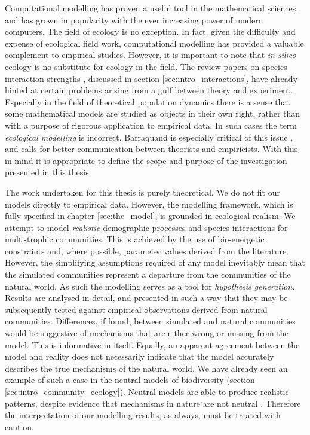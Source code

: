 Computational modelling has proven a useful tool in the mathematical sciences, and has grown in popularity with the ever increasing power of modern computers. The field of ecology is no exception. In fact, given the difficulty and expense of ecological field work, computational modelling has provided a valuable complement to empirical studies. However, it is important to note that \emph{in silico} ecology is no substitute for ecology in the field. The review papers on species interaction strengths \cite{berlow2004interaction,wootton2005measurement}, discussed in section \ref{sec:intro_interactions}, have already hinted at certain problems arising from a gulf between theory and experiment. Especially in the field of theoretical population dynamics there is a sense that some mathematical models are studied as objects in their own right, rather than with a purpose of rigorous application to empirical data. In such cases the term \emph{ecological modelling} is incorrect. Barraquand is especially critical of this issue \cite{barraquand2014functional}, and calls for better communication between theorists and empiricists. With this in mind it is appropriate to define the scope and purpose of the investigation presented in this thesis. 

The work undertaken for this thesis is purely theoretical. We do not fit our models directly to empirical data. However, the modelling framework, which is fully specified in chapter \ref{sec:the_model}, is grounded in ecological realism. We attempt to model \emph{realistic} demographic processes and species interactions for multi-trophic communities. This is achieved by the use of bio-energetic constraints and, where possible, parameter values derived from the literature. However, the simplifying assumptions required of any model inevitably mean that the simulated communities represent a departure from the communities of the natural world. As such the modelling serves as a tool for \emph{hypothesis generation}. Results are analysed in detail, and presented in such a way that they may be subsequently tested against empirical observations derived from natural communities. Differences, if found, between simulated and natural communities would be suggestive of mechanisms that are either wrong or missing from the model. This is informative in itself. Equally, an apparent agreement between the model and reality does not necessarily indicate that the model accurately describes the true mechanisms of the natural world. We have already seen an example of such a case in the neutral models of biodiversity (section \ref{sec:intro_community_ecology}). Neutral models are able to produce realistic patterns, despite evidence that mechanisms in nature are not neutral \cite{purves2005ecological}. Therefore the interpretation of our modelling results, as always, must be treated with caution.

